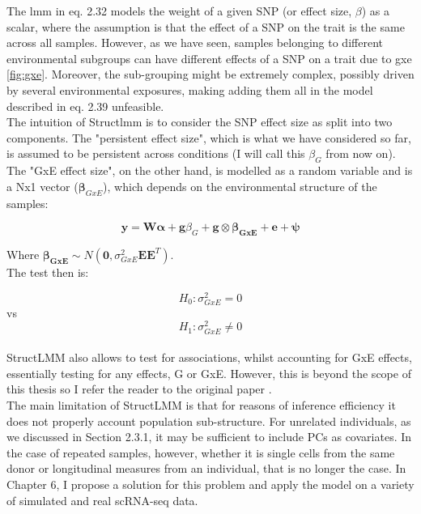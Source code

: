 The \gls{lmm} in eq. 2.32 models the weight of a given SNP (or effect size, $\beta$) as a scalar, where the assumption is that the effect of a SNP on the trait is the same across all samples.
However, as we have seen, samples belonging to different environmental subgroups can have different effects of a SNP on a trait due to \gls{gxe} \ref{fig:gxe}.
Moreover, the sub-grouping might be extremely complex, possibly driven by several environmental exposures, making adding them all in the model described in eq. 2.39 unfeasible.\\

The intuition of Struct\gls{lmm} is to consider the SNP effect size as split into two components.
The "persistent effect size", which is what we have considered so far, is assumed to be persistent across conditions (I will call this $\beta_G$ from now on). 
The "GxE effect size", on the other hand, is modelled as a random variable and is a Nx1 vector ($\boldsymbol{\beta}_{GxE}$), which depends on the environmental structure of the samples:

\begin{equation}\label{eq:StructLMM-int}
 \mathbf{y} =  \mathbf{W}\boldsymbol{\alpha} + \mathbf{g}\beta_G + \mathbf{g} \otimes \boldsymbol{\beta_{GxE}} + \mathbf{e} + \boldsymbol{\psi} 
\end{equation}

Where $\boldsymbol{\beta_{GxE}} \sim N(\mathbf{0}, \sigma^2_{GxE}\mathbf{E}\mathbf{E}^T)$.\\

The test then is:

\begin{equation}
 H_{0}: \sigma^2_{GxE}=0 
\end{equation}
vs
\begin{equation}
 H_{1}: \sigma^2_{GxE} \neq 0 
\end{equation}\\

StructLMM also allows to test for associations, whilst accounting for GxE effects, essentially testing for any effects, G or GxE.
However, this is beyond the scope of this thesis so I refer the reader to the original paper \cite{moore2019linear}.\\

The main limitation of StructLMM is that for reasons of inference efficiency it does not properly account population sub-structure.
For unrelated individuals, as we discussed in Section 2.3.1, it may be sufficient to include PCs as covariates.
In the case of repeated samples, however, whether it is single cells from the same donor or longitudinal measures from an individual, that is no longer the case.
In Chapter 6, I propose a solution for this problem and apply the model on a variety of simulated and real scRNA-seq data.


